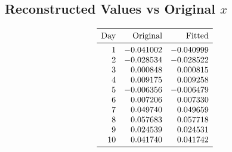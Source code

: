 \documentclass{article}
\begin{document}
\subsection*{Reconstructed Values vs Original \(x\)}
\[
\begin{array}{r r r}
\toprule
\text{Day} & \text{Original} & \text{Fitted} \\
\midrule
1  & -0.041002 & -0.040999 \\
2  & -0.028534 & -0.028522 \\
3  &  0.000848 &  0.000815 \\
4  &  0.009175 &  0.009258 \\
5  & -0.006356 & -0.006479 \\
6  &  0.007206 &  0.007330 \\
7  &  0.049740 &  0.049659 \\
8  &  0.057683 &  0.057718 \\
9  &  0.024539 &  0.024531 \\
10 &  0.041740 &  0.041742 \\
\bottomrule
\end{array}
\]
\end{document}
